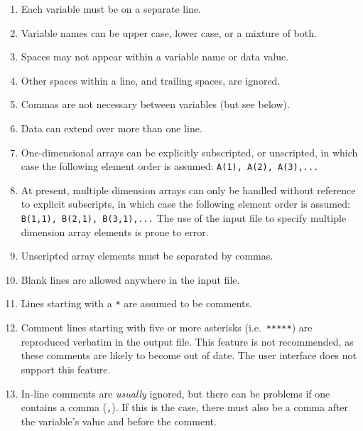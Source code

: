\begin{enumerate}

\item Each variable must be on a separate line.

\item Variable names can be upper case, lower case, or a mixture of both.

\item Spaces may not appear within a variable name or data value.

\item Other spaces within a line, and trailing spaces, are ignored.

\item Commas are not necessary between variables (but see below).

\item Data can extend over more than one line.

\item One-dimensional arrays can be explicitly subscripted, or unscripted, in
  which case the following element order is assumed: \texttt{A(1), A(2),
    A(3),...}

\item At present, multiple dimension arrays can only be handled without
  reference to explicit subscripts, in which case the following element order
  is assumed: \texttt{B(1,1), B(2,1), B(3,1),...} The use of the input file to
  specify multiple dimension array elements is prone to error.

\item Unscripted array elements must be separated by commas.

\item Blank lines are allowed anywhere in the input file.

\item Lines starting with a \texttt{*} are assumed to be comments.

\item Comment lines starting with five or more asterisks (i.e.\
  \texttt{*****}) are reproduced verbatim in the output file. This feature is not recommended, as these comments are likely to become out of date.  The user interface does not support this feature.

\item In-line comments are \textit{usually}\/ ignored, but there can be
  problems if one contains a comma (\texttt{,}). If this is the case, there
  must also be a comma after the variable's value and before the comment.

\end{enumerate}

